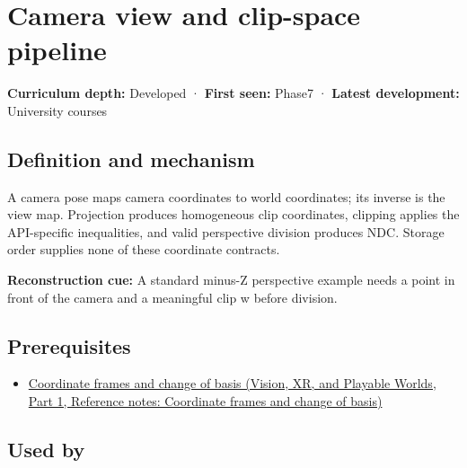 \hypertarget{appendix-1c07d64f5e70}{}\label{referencestart:appendix-1c07d64f5e70}
\section{Camera view and clip-space pipeline}\label{appendix-1c07d64f5e70-camera-view-and-clip-space-pipeline}

\hypertarget{appendix-1c07d64f5e70-camera-view-and-clip-space-pipeline}{}

\textbf{Curriculum depth:} Developed · \textbf{First seen:} Phase7 · \textbf{Latest development:} University courses

\begin{allmightroledefinition}

\subsection{Definition and mechanism}\label{appendix-1c07d64f5e70-definition-and-mechanism}

\hypertarget{appendix-1c07d64f5e70-definition-and-mechanism}{}

A camera pose maps camera coordinates to world coordinates; its inverse is the view map. Projection produces homogeneous clip coordinates, clipping applies the API-specific inequalities, and valid perspective division produces NDC. Storage order supplies none of these coordinate contracts.

\end{allmightroledefinition}

\textbf{Reconstruction cue:} A standard minus-Z perspective example needs a point in front of the camera and a meaningful clip w before division.

\subsection{Prerequisites}\label{appendix-1c07d64f5e70-prerequisites}

\hypertarget{appendix-1c07d64f5e70-prerequisites}{}

\begin{itemize}
\tightlist
\item
  \href{../07-Vision-XR-and-Playable-Worlds-P01/main.pdf\#appendix-1bae9457dbc3}{Coordinate frames and change of basis (Vision, XR, and Playable Worlds, Part 1, Reference notes: Coordinate frames and change of basis)}
\end{itemize}

\subsection{Used by}\label{appendix-1c07d64f5e70-used-by}

